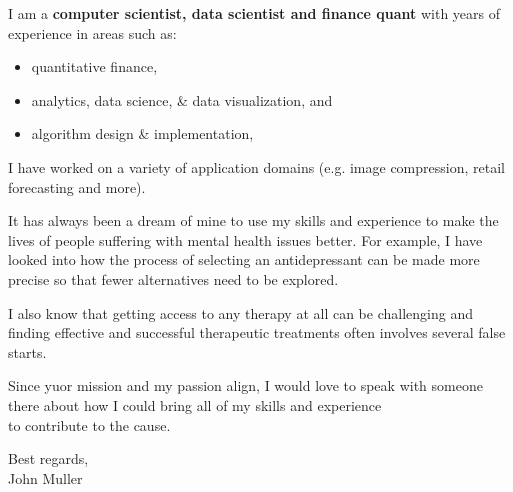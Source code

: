 \documentclass{letter}
\begin{document}
\noindent
I am a \textbf {computer scientist, data scientist and finance quant} with years of experience 
in areas such as:
\vspace{-.1in}
\begin{itemize}[noitemsep]
 \item quantitative finance, 
 \item analytics, data science, \& data visualization, and
 \item algorithm design \& implementation,
\end{itemize}

\noindent I have worked on a variety of application domains 
(e.g. image compression, retail forecasting and more).

\noindent It has always been a dream of mine to use my skills and experience to make the lives of people suffering with mental health issues better.
For example, I have looked into how the process of selecting an antidepressant can be made more precise
so that fewer alternatives need to be explored.

\noindent I also know that getting access to any therapy at all  can be challenging and finding effective and successful therapeutic treatments often involves several false starts.

\noindent
Since yuor mission and my passion align, I would love to speak with someone there about how I could bring all of my skills and experience \\
to contribute to the cause.

\vspace*{0.2in}
\noindent Best regards,\\
John Muller
\end{document}
